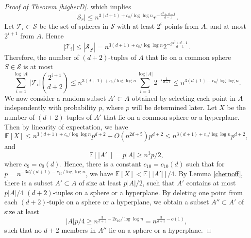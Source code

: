 \documentclass[11pt]{article}
\theoremstyle{plain}
\theoremstyle{definition}
\theoremstyle{remark}
\begin{document}
\begin{proof}[Proof of Theorem \ref{higherD}]
%
    \noindent which implies 
%
$$|\mathcal{S}_r| \leq n^{3(d+1)+c_8/\log\log n} r^{-\frac{d^2+d-1}{d-1}}.$$
%
Let $\mathcal{T}_i\subset \mathcal{S}$ be the set of spheres in $\mathcal{S}$ with at least $2^i$ points from $A$, and at most $2^{i +1}$ from $A$.  Hence
%
$$|\mathcal{T}_i| \leq |\mathcal{S}_{2^i}| = n^{3(d+1)+c_8/\log\log n} 2^{-i\frac{d^2+d-1}{d-1}}.$$
%
\noindent Therefore, the number of $(d+2)$-tuples of $A$ that lie on a common sphere $S \in \mathcal{S}$ is at most
%
%
$$\sum\limits_{i = 1}^{\log |A|} |\mathcal{T}_i|\binom{2^{i + 1}}{d+2} \leq n^{3(d+1)+c_8/\log\log n}\sum\limits_{i = 1}^{\log |A|}  2^{-i\frac{1}{d-1}} \leq n^{3(d+1)+c_8/\log\log n}. $$
%
%
%
We now consider a random subset $A'\subset A$ obtained by selecting each point in $A$ independently with probability $p$, where $p$ will be determined later. Let $X$ be the number of $(d+2)$-tuples of $A'$ that lie on a common sphere or a hyperplane.  Then by linearity of expectation, we have
%
%
$$\mathbb{E}[X] \leq n^{3(d+1)+c_8/\log\log n}p^{d+2} + O(n^{2d + 5})p^{d+2} \leq n^{3(d+1)+c_9/\log\log n}p^{d+2},$$
%
\noindent and
%
$$\mathbb{E}[|A'|] = p|A|\geq n^3p/2,$$where $c_9 = c_9(d)$.  Hence, there is a constant $c_{10} = c_{10}(d)$ such that for $p = n^{-3d/(d+1) - c_{10}/\log\log n}$, we have $\mathbb{E}[X] < \mathbb{E}[|A'|]/4$.  By Lemma \ref{chernoff}, there is a subset $A'\subset A$ of size at least $p|A|/2$, such that $A'$ contains at most $p|A|/4$ $(d+2)$-tuples on a sphere or a hyperplane.  By deleting one point from each $(d+2)$-tuple on a sphere or a hyperplane, we obtain a subset $A''\subset A'$ of size at least
$$|A|p/4 \geq n^{\frac{3}{d+ 1} - 2c_{10}/\log\log n} = n^{\frac{3}{d+ 1} - o(1)},$$
%
\noindent such that no $d+2$ members in $A''$ lie on a sphere or a hyperplane.\end{proof}
%
%
%
%
%
%
%
%
%
%
%
%
%
%
%
\end{document}
